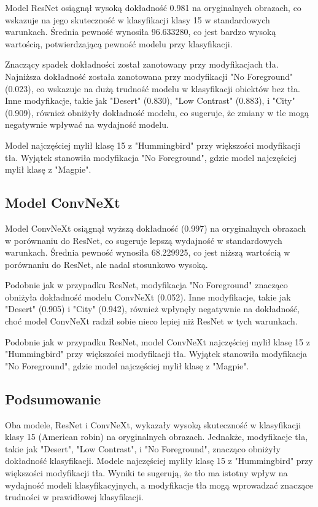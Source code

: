 Model ResNet osiągnął wysoką dokładność 0.981 na oryginalnych obrazach, co wskazuje na jego skuteczność w klasyfikacji klasy 15 w standardowych warunkach. Średnia pewność wynosiła 96.633280, co jest bardzo wysoką wartością, potwierdzającą pewność modelu przy klasyfikacji.

Znaczący spadek dokładności został zanotowany przy modyfikacjach tła. Najniższa dokładność została zanotowana przy modyfikacji "No Foreground" (0.023), co wskazuje na dużą trudność modelu w klasyfikacji obiektów bez tła. Inne modyfikacje, takie jak "Desert" (0.830), "Low Contrast" (0.883), i "City" (0.909), również obniżyły dokładność modelu, co sugeruje, że zmiany w tle mogą negatywnie wpływać na wydajność modelu.

Model najczęściej mylił klasę 15 z "Hummingbird" przy większości modyfikacji tła. Wyjątek stanowiła modyfikacja "No Foreground", gdzie model najczęściej mylił klasę z "Magpie".

\subsection*{Model ConvNeXt}

Model ConvNeXt osiągnął wyższą dokładność (0.997) na oryginalnych obrazach w porównaniu do ResNet, co sugeruje lepszą wydajność w standardowych warunkach. Średnia pewność wynosiła 68.229925, co jest niższą wartością w porównaniu do ResNet, ale nadal stosunkowo wysoką.

Podobnie jak w przypadku ResNet, modyfikacja "No Foreground" znacząco obniżyła dokładność modelu ConvNeXt (0.052). Inne modyfikacje, takie jak "Desert" (0.905) i "City" (0.942), również wpłynęły negatywnie na dokładność, choć model ConvNeXt radził sobie nieco lepiej niż ResNet w tych warunkach.

Podobnie jak w przypadku ResNet, model ConvNeXt najczęściej mylił klasę 15 z "Hummingbird" przy większości modyfikacji tła. Wyjątek stanowiła modyfikacja "No Foreground", gdzie model najczęściej mylił klasę z "Magpie".

\subsection*{Podsumowanie}

Oba modele, ResNet i ConvNeXt, wykazały wysoką skuteczność w klasyfikacji klasy 15 (American robin) na oryginalnych obrazach. Jednakże, modyfikacje tła, takie jak "Desert", "Low Contrast", i "No Foreground", znacząco obniżyły dokładność klasyfikacji. Modele najczęściej myliły klasę 15 z "Hummingbird" przy większości modyfikacji tła. Wyniki te sugerują, że tło ma istotny wpływ na wydajność modeli klasyfikacyjnych, a modyfikacje tła mogą wprowadzać znaczące trudności w prawidłowej klasyfikacji.


